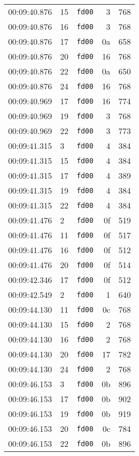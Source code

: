 \documentclass{article}
\begin{document}
\begin{longtable}{lllrr}
00:09:40.876 & 15 & \texttt{fd00} & 3 & 768 \\
00:09:40.876 & 16 & \texttt{fd00} & 3 & 768 \\
00:09:40.876 & 17 & \texttt{fd00} & 0a & 658 \\
00:09:40.876 & 20 & \texttt{fd00} & 16 & 768 \\
00:09:40.876 & 22 & \texttt{fd00} & 0a & 650 \\
00:09:40.876 & 24 & \texttt{fd00} & 16 & 768 \\
00:09:40.969 & 17 & \texttt{fd00} & 16 & 774 \\
00:09:40.969 & 19 & \texttt{fd00} & 3 & 768 \\
00:09:40.969 & 22 & \texttt{fd00} & 3 & 773 \\
00:09:41.315 & 3 & \texttt{fd00} & 4 & 384 \\
00:09:41.315 & 15 & \texttt{fd00} & 4 & 384 \\
00:09:41.315 & 17 & \texttt{fd00} & 4 & 389 \\
00:09:41.315 & 19 & \texttt{fd00} & 4 & 384 \\
00:09:41.315 & 22 & \texttt{fd00} & 4 & 384 \\
00:09:41.476 & 2 & \texttt{fd00} & 0f & 519 \\
00:09:41.476 & 11 & \texttt{fd00} & 0f & 517 \\
00:09:41.476 & 16 & \texttt{fd00} & 0f & 512 \\
00:09:41.476 & 20 & \texttt{fd00} & 0f & 514 \\
00:09:42.346 & 17 & \texttt{fd00} & 0f & 512 \\
00:09:42.549 & 2 & \texttt{fd00} & 1 & 640 \\
00:09:44.130 & 11 & \texttt{fd00} & 0c & 768 \\
00:09:44.130 & 15 & \texttt{fd00} & 2 & 768 \\
00:09:44.130 & 16 & \texttt{fd00} & 2 & 768 \\
00:09:44.130 & 20 & \texttt{fd00} & 17 & 782 \\
00:09:44.130 & 24 & \texttt{fd00} & 2 & 768 \\
00:09:46.153 & 3 & \texttt{fd00} & 0b & 896 \\
00:09:46.153 & 17 & \texttt{fd00} & 0b & 902 \\
00:09:46.153 & 19 & \texttt{fd00} & 0b & 919 \\
00:09:46.153 & 20 & \texttt{fd00} & 0c & 784 \\
00:09:46.153 & 22 & \texttt{fd00} & 0b & 896 \\

\end{longtable}
\end{document}
